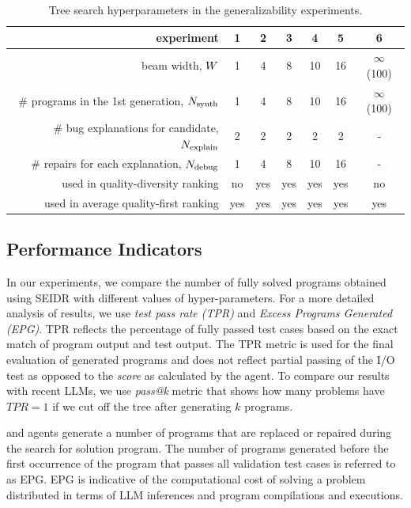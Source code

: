 \begin{table}[h]
    \centering
    \caption{Tree search hyperparameters in the generalizability experiments.}\small
    \label{tab:w-n}
    \begin{tabular}{rcccccc}
    \toprule
    experiment & 1 & 2 & 3 & 4 & 5 & 6 \\
    \midrule
     beam width, $W{}$ & 1 & 4 & 8 & 10 & 16 & $\infty$ (100) \\
     \# programs in the 1st generation, $N_\text{synth}{}$ & 1 & 4 & 8 & 10 & 16 & $\infty$ (100) \\
     \# bug explanations for candidate, $N_\text{explain}{}$ & 2 & 2 & 2 & 2 & 2 & - \\
     \# repairs for each explanation, $N_\text{debug}{}$ & 1 & 4 & 8 & 10 & 16 & - \\
     \midrule
     used in quality-diversity ranking & 
     no & yes & yes & yes & yes & no \\
     used in average quality-first ranking  & 
     yes & yes & yes & yes & yes & yes \\
     \bottomrule
    \end{tabular}
\end{table}



\newpage \subsection{Performance Indicators}
\label{sec:seidr-metrics}

\sloppy %
In our experiments, we compare 
the number of fully solved programs obtained using SEIDR with different values of hyper-parameters. 
For a more detailed analysis of results, we use \emph{test pass rate (TPR)} and \emph{Excess Programs Generated (EPG)}.
TPR reflects the percentage of fully passed test cases based on the exact match of program output and test output. 
The TPR metric is used for the final evaluation of generated programs and does not reflect partial passing of the I/O test as opposed to the \emph{score} as calculated by the \rank{} agent. 
To compare our results with recent LLMs, we use \emph{pass@k} metric that shows how many problems have $TPR=1$ if we cut off the tree after generating $k$ programs. 

\debug{} and \execute{} agents generate a number of programs that are replaced or repaired during the search for solution program. 
The number of programs generated before the first occurrence of the program that passes all validation test cases is referred to as EPG. 
EPG is indicative of the computational cost of solving a problem distributed in terms of LLM inferences and program compilations and executions.

